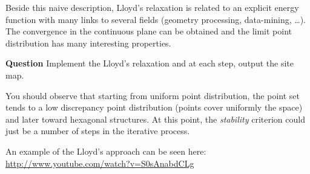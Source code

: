 \documentclass[a4paper, 11pt]{article}
\begin{document}
\par Beside this naive description, Lloyd's relaxation is related to an explicit energy function with many links to several fields (geometry processing, data-mining, \ldots). The convergence in the continuous plane can be obtained and the limit point distribution has many interesting properties.

\bigskip
{\bf Question} Implement the Lloyd's relaxation and at each step, output the site map.

\bigskip
\par You should observe that starting from uniform point distribution, the point set tends to a low discrepancy point distribution (points cover uniformly the space) and later toward hexagonal structures. At this point, the \emph{stability} criterion could just be a number of steps in the iterative process.

\par An example of the Lloyd's approach can be seen here: \url{http://www.youtube.com/watch?v=S0sAnabdCLg}
\end{document}
